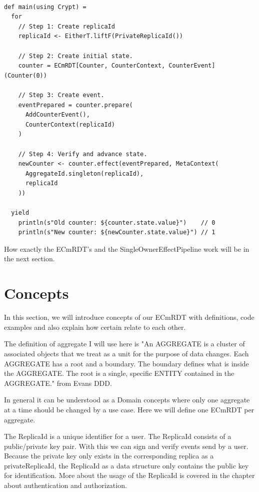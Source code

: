 \documentclass[
	ngerman,
	ruledheaders=section,   %
	class=report,		    %
	thesis={type=bachelor}, %
	accentcolor=9c,			%
	custommargins=true,    %
	marginpar=false,        %
	parskip=half-,          %
	fontsize=11pt,          %
]{tudapub}
\begin{document}
\begin{lstlisting}
    
def main(using Crypt) = 
  for
    // Step 1: Create replicaId
    replicaId <- EitherT.liftF(PrivateReplicaId())

    // Step 2: Create initial state.
    counter = ECmRDT[Counter, CounterContext, CounterEvent](Counter(0))

    // Step 3: Create event.
    eventPrepared = counter.prepare(
      AddCounterEvent(),
      CounterContext(replicaId)
    )

    // Step 4: Verify and advance state.
    newCounter <- counter.effect(eventPrepared, MetaContext(
      AggregateId.singleton(replicaId), 
      replicaId
    ))

  yield
    println(s"Old counter: ${counter.state.value}")    // 0
    println(s"New counter: ${newCounter.state.value}") // 1

\end{lstlisting}

How exactly the ECmRDT's and the SingleOwnerEffectPipeline work will be in the next section.

\section{Concepts}

In this section, we will introduce concepts of our ECmRDT with definitions, code examples and also explain how certain relate to each other.

The definition of aggregate I will use here is "An AGGREGATE is a cluster of associated objects that we treat as a unit for the purpose of data changes. Each AGGREGATE has a root and a boundary. The boundary defines what is inside the AGGREGATE. The root is a single, specific ENTITY contained in the AGGREGATE." from Evans DDD.

In general it can be understood as a Domain concepts where only one aggregate at a time should be changed by a use case. Here we will define one ECmRDT per aggregate. 

The ReplicaId is a unique identifier for a user. The ReplicaId consists of a public/private key pair. With this we can sign and verify events send by a user. Because the private key only exists in the corresponding replica as a privateReplicaId, the ReplicaId as a data structure only contains the public key for identification. More about the usage of the ReplicaId is covered in the chapter about authentication and authorization. 
\end{document}

